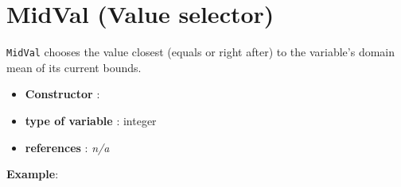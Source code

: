 \section{MidVal (Value selector)}\label{midval:midvalvalselector}\hypertarget{midval:midvalvalselector}{}
\begin{notedef}
  \texttt{MidVal} chooses the value closest (equals or right after) to the variable's domain mean of its current bounds.
\end{notedef}

\begin{itemize}
	\item \textbf{Constructor} : 
	\item \textbf{type of variable} : integer
	\item \textbf{references} : \emph{n/a}
\end{itemize}

\textbf{Example}:
%

